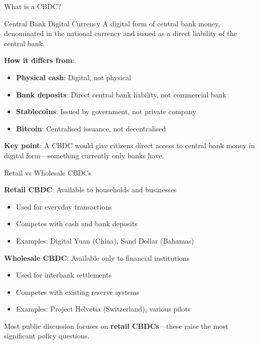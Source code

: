 \documentclass[10pt]{beamer}
\newcommand{\highlight}[1]{\textcolor{AccentOrange}{\textbf{#1}}}
\begin{document}
\begin{frame}{What is a CBDC?}
  \begin{block}{Central Bank Digital Currency}
    A digital form of central bank money, denominated in the national currency and issued as a direct liability of the central bank.
  \end{block}
  
  \vspace{1em}
  \textbf{How it differs from}:
  \begin{itemize}
    \item \textbf{Physical cash}: Digital, not physical
    \item \textbf{Bank deposits}: Direct central bank liability, not commercial bank
    \item \textbf{Stablecoins}: Issued by government, not private company
    \item \textbf{Bitcoin}: Centralised issuance, not decentralised
  \end{itemize}
  
  \vspace{1em}
  \textbf{Key point}: A CBDC would give citizens direct access to central bank money in digital form---something currently only banks have.
\end{frame}

\begin{frame}{Retail vs Wholesale CBDCs}
  
  \textbf{Retail CBDC}: Available to households and businesses
  \begin{itemize}
    \item Used for everyday transactions
    \item Competes with cash and bank deposits
    \item Examples: Digital Yuan (China), Sand Dollar (Bahamas)
  \end{itemize}
  
  \vspace{1em}
  \textbf{Wholesale CBDC}: Available only to financial institutions
  \begin{itemize}
    \item Used for interbank settlements
    \item Competes with existing reserve systems
    \item Examples: Project Helvetia (Switzerland), various pilots
  \end{itemize}
  
  \vspace{1em}
  Most public discussion focuses on \highlight{retail CBDCs}---these raise the most significant policy questions.
\end{frame}
\end{document}
